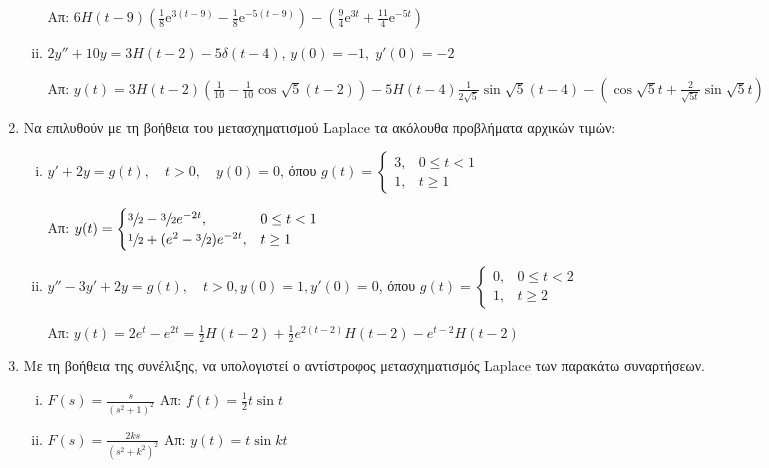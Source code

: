 \begin{enumerate}
\begin{enumerate}[i)]
        \hfill Απ: $ 6H(t-9) \left(\frac{1}{8} \mathrm{e}^{3(t-9)} - \frac{1}{8}
        \mathrm{e}^{-5(t-9)}\right) - \left(\frac{9}{4} \mathrm{e}^{3t} + \frac{11}{4}
        \mathrm{e}^{-5t}\right) $ 
      \item $ 2y''+10y=3H(t-2) - 5 \delta (t-4) $, \quad$ y(0)=-1, \; y'(0)=-2$ 

        \hfill Απ: $ y(t) = 3H(t-2)\left(\frac{1}{10} - \frac{1}{10} 
        \cos{\sqrt{5} (t-2)}\right) - 5 H(t-4) \frac{1}{2 \sqrt{5}} 
        \sin{\sqrt{5} (t-4)} - \left(\cos{\sqrt{5} t} + \frac{2}{\sqrt{5 t}} 
        \sin{\sqrt{5} t}\right)$ 
    \end{enumerate}

  \item Να επιλυθούν με τη βοήθεια του μετασχηματισμού Laplace τα ακόλουθα 
    προβλήματα αρχικών τιμών:
    \begin{enumerate}[i)]
      \item $y'+2y=g(t),\quad t>0,\quad y(0)=0$, 
        όπου $g(t)=
        \begin{cases}
          3, & 0\leq t<1 \\ 1, & t\geq 1
        \end{cases}$

        \hfill Απ: $y(t)=
        \begin{cases} 
          \sfrac{3}{2}-\sfrac{3}{2}e^{-2t},& 0\leq t<1 \\ 
          \sfrac{1}{2}+(e^2-\sfrac{3}{2})e^{-2t}, & t\geq 1
        \end{cases}$

      \item $y''-3y'+2y=g(t),\quad t>0, y(0)=1, y'(0)=0$, 
        όπου $g(t)=
        \begin{cases} 
          0, & 0\leq t<2 \\ 1, & t\geq 2
        \end{cases}$

        \hfill Απ: $y(t)=2e^t-e^{2t}=\frac{1}{2}H(t-2)+
        \frac{1}{2}e^{2(t-2)}H(t-2)-e^{t-2}H(t-2)$
    \end{enumerate}

  \item Με τη βοήθεια της συνέλιξης, να υπολογιστεί ο αντίστροφος μετασχηματισμός 
    Laplace των παρακάτω συναρτήσεων.
    \begin{enumerate}[i)]
      \item $ F(s) = \frac{s}{(s^{2}+1)^{2}}$ \hfill Απ: $f(t) = \frac{1}{2}t\sin{t}$ 
      \item $ F(s) = \frac{2 k s}{(s^{2}+k^{2})^{2}} $ \hfill Απ: $ y(t) = t \sin{kt} $  
    \end{enumerate}
\end{enumerate}


    
